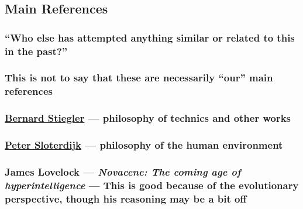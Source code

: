 \documentclass[11pt]{article}
\begin{document}
\subsection{Main References}
\label{sec:orgaab3331}

\subsubsection{``Who else has attempted anything similar or related to this in the past?''}
\label{sec:orgf925610}
\subsubsection{This is not to say that these are necessarily ``our'' main references}
\label{sec:orge36371e}
\subsubsection{\href{https://en.wikipedia.org/wiki/Bernard\_Stiegler\#Books\_in\_English}{Bernard Stiegler} — philosophy of technics and other works}
\label{sec:org4f14870}
\subsubsection{\href{https://en.wikipedia.org/wiki/Peter\_Sloterdijk\#Works\_in\_English\_translation}{Peter Sloterdijk} — philosophy of the human environment}
\label{sec:orgf808942}
\subsubsection{James Lovelock — \emph{Novacene: The coming age of hyperintelligence} — This is good because of the evolutionary perspective, though his reasoning may be a bit off}
\label{sec:org9416e8b}
\end{document}
